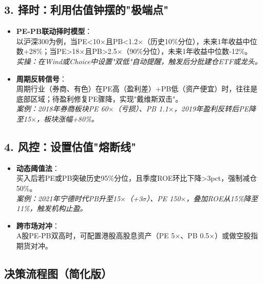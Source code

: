 \subsection{3. 择时：利用估值钟摆的"极端点"}
\begin{itemize}[leftmargin=*, nosep]
\item \textbf{PE-PB联动择时模型}：\\
以沪深300为例，当PE<10$\times$且PB<1.2$\times$（历史10\%分位），未来1年收益中位数+28\%；当PE>18$\times$且PB>2.5$\times$（90\%分位），未来1年收益中位数-12\%。\\
\textit{实操：在Wind或Choice中设置"双低"自动提醒，触发后分批建仓ETF或龙头。}

\item \textbf{周期反转信号}：\\
周期行业（券商、有色）在PE高（盈利差）+PB低（资产便宜）时，往往是底部区域；待盈利修复PE骤降，实现"戴维斯双击"。\\
\textit{案例：2018年券商板块PE 60$\times$（亏损）、PB 1.1$\times$，2019年盈利反转后PE降至15$\times$，板块涨幅+80\%。}
\end{itemize}

\subsection{4. 风控：设置估值"熔断线"}
\begin{itemize}[leftmargin=*, nosep]
\item \textbf{动态阈值法}：\\
买入后若PE或PB突破历史95\%分位，且季度ROE环比下降>3pct，强制减仓50\%。\\
\textit{案例：2021年宁德时代PB升至15$\times$（+3$\sigma$）、PE 150$\times$，叠加ROE从15\%降至11\%，触发机构止盈。}

\item \textbf{跨市场对冲}：\\
A股PE-PB双高时，可配置港股高股息资产（PE 5$\times$、PB 0.5$\times$）或做空股指期货对冲。
\end{itemize}

\subsection{决策流程图（简化版）}
\usetikzlibrary{shapes, arrows, positioning} %


